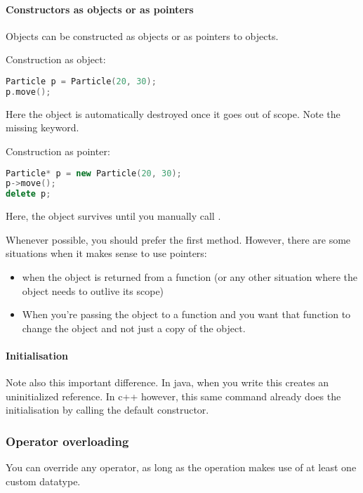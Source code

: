 \paragraph{Constructors as objects or as pointers} Objects can be constructed as objects or as pointers to objects. 

Construction as object: 
\begin{lstlisting}[language=c++]
Particle p = Particle(20, 30);
p.move();
\end{lstlisting}
Here the object is automatically destroyed once it goes out of scope. Note the missing  keyword.

Construction as pointer: 
\begin{lstlisting}[language=c++]
Particle* p = new Particle(20, 30);
p->move();
delete p;
\end{lstlisting}
Here, the object survives until you manually call .

Whenever possible, you should prefer the first method. However, there are some situations when it makes sense to use pointers: 

\begin{itemize}
    \item when the object is returned from a function (or any other situation where the object needs to outlive its scope)
    \item When you're passing the object to a function and you want that function to change the object and not just a copy of the object. 
\end{itemize}



\paragraph{Initialisation} Note also this important difference. In java, when you write  this creates an uninitialized reference. In c++ however, this same command already does the initialisation by calling the default constructor.



\subsubsection{Operator overloading}
You can override any operator, as long as the operation makes use of at least one custom datatype. 

